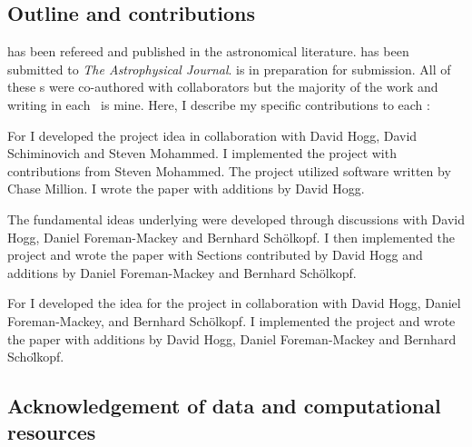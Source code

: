 \documentclass[12pt, preprint]{aastex}
\begin{document}
\subsection{Outline and contributions}
 has been refereed and published in the astronomical literature.
 has been submitted to \emph{The Astrophysical Journal}.
 is in preparation for submission.
All of these \chapname s were co-authored with collaborators but the majority of the work and writing in each \chapname\ is mine.
Here, I describe my specific contributions to each \chapname:
\begin{enumerate}

{\item For   I developed the project idea in collaboration with David Hogg, David Schiminovich and Steven Mohammed.
I implemented the project with contributions from Steven Mohammed.
The project utilized software written by Chase Million.
I wrote the paper with additions by David Hogg.}

{\item The fundamental ideas underlying  were developed through discussions with David Hogg, Daniel Foreman-Mackey and Bernhard Sch\"olkopf.
I then implemented the project and wrote the paper with Sections contributed by David Hogg and additions by Daniel Foreman-Mackey and Bernhard Sch\"olkopf.}

{\item For  I developed the idea for the project in collaboration with David Hogg, Daniel Foreman-Mackey, and Bernhard Sch\"olkopf.
I implemented the project and wrote the paper with additions by David Hogg, Daniel Foreman-Mackey and Bernhard Scho\"lkopf.
}
\end{enumerate}

\subsection{Acknowledgement of data and computational resources}

\clearpage

%
\clearpage
\end{document}
